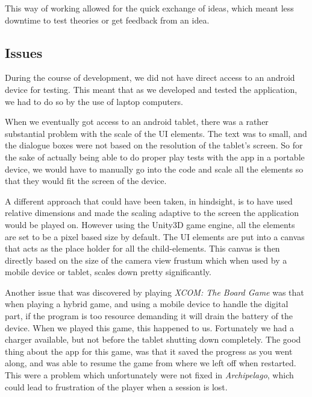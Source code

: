 This way of working allowed for the quick exchange of ideas, which meant less downtime to test theories or get feedback from an idea.

\subsection{Issues}
During the course of development, we did not have direct access to an android device for testing. This meant that as we developed and tested the application, we had to do so by the use of laptop computers. 

When we eventually got access to an android tablet, there was a rather substantial problem with the scale of the UI elements. The text was to small, and the dialogue boxes were not based on the resolution of the tablet's screen. So for the sake of actually being able to do proper play tests with the app in a portable device, we would have to manually go into the code and scale all the elements so that they would fit the screen of the device. 

A different approach that could have been taken, in hindsight, is to have used relative dimensions and made the scaling adaptive to the screen the application would be played on. However using the Unity3D game engine, all the elements are set to be a pixel based size by default. The UI elements are put into a canvas that acts as the place holder for all the child-elements. This canvas is then directly based on the size of the camera view frustum which when used by a mobile device or tablet, scales down pretty significantly. 

Another issue that was discovered by playing \textit{XCOM: The Board Game} \cite{game:xcomtbg} was that when playing a hybrid game, and using a mobile device to handle the digital part, if the program is too resource demanding it will drain the battery of the device. When we played this game, this happened to us. Fortunately we had a charger available, but not before the tablet shutting down completely. The good thing about the app for this game, was that it saved the progress as you went along, and was able to resume the game from where we left off when restarted.
This were a problem which unfortunately were not fixed in \textit{Archipelago}, which could lead to frustration of the player when a session is lost.